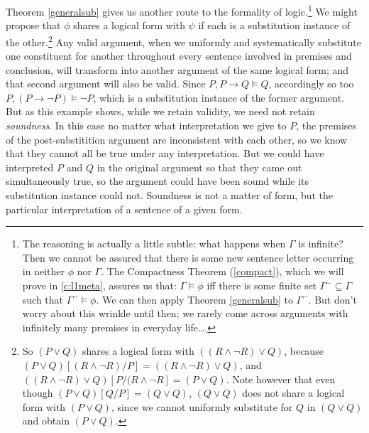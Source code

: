 Theorem \ref{generalsub} gives us another route to the formality of logic.\footnote{The reasoning is actually a little subtle: what happens when $\Gamma$ is infinite? Then we cannot be assured that there is some new sentence letter occurring in neither $\phi$ nor $\Gamma$. The Compactness Theorem (\autoref{compact}), which we will prove in \autoref{c:l1meta}, assures us that: $\Gamma \vDash \phi$ iff there is some finite set $\Gamma^{-} \subseteq \Gamma$ such that $\Gamma^{-} \vDash \phi$. We can then apply Theorem \ref{generalsub} to $\Gamma^{-}$. But don't worry about this wrinkle until then; we rarely come across arguments with infinitely many premises in everyday life….} We might propose that $\phi$ shares a logical form with $\psi$ if each is a substitution instance of the other.\footnote{So $(P\vee Q)$ shares a logical form with $((R\wedge ¬R) \vee Q)$, because $(P\vee Q)[(R \wedge \neg R)/P] = ((R\wedge ¬R) \vee Q)$, and $((R\wedge ¬R) \vee Q)[P/(R \wedge ¬R] = (P\vee Q)$. Note however that even though $(P\vee Q)[Q/P] = (Q \vee Q)$, $(Q \vee Q)$ does not share a logical form with $(P \vee Q)$, since we cannot uniformly substitute for $Q$ in $(Q\vee Q)$ and obtain $(P\vee Q)$.} Any valid argument, when we uniformly and systematically substitute one constituent for another throughout every sentence involved in premises and conclusion, will transform into another argument of the same logical form; and that second argument will also be valid. Since $P, P\to Q \vDash Q$, accordingly so too $P, (P \to \neg P) \vDash \neg P$, which is a substitution instance of the former argument. But as this example shows, while we retain validity, we need not retain \emph{soundness}. In this case no matter what interpretation we give to $P$, the premises of the post-substitition argument are inconsistent with each other, so we know that they cannot all be true under any interpretation. But we could have interpreted $P$ and $Q$ in the original argument so that they came out simultaneously true, so the argument could have been sound while its substitution instance could not. Soundness is not a matter of form, but the particular interpretation of a sentence of a given form. 

